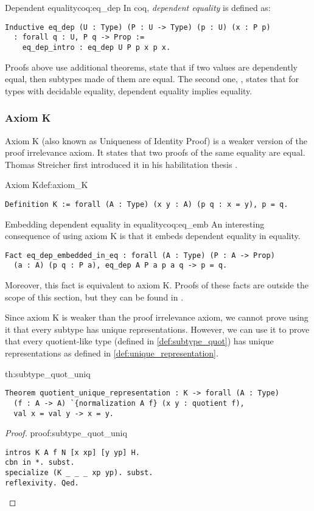 \begin{coq}{Dependent equality}{coq:eq_dep}
In coq, \emph{dependent equality} is defined as:
\begin{verbatim}
Inductive eq_dep (U : Type) (P : U -> Type) (p : U) (x : P p) 
  : forall q : U, P q -> Prop :=
    eq_dep_intro : eq_dep U P p x p x.
\end{verbatim}
Proofs above use additional theorems,  state that if two values are dependently equal, then subtypes made of them are equal. The second one, , states that for types with decidable equality, dependent equality implies equality.
\end{coq}

\subsubsection{Axiom K}
Axiom K (also known as Uniqueness of Identity Proof) is a weaker version of the proof irrelevance axiom. It states that two proofs of the same equality are equal. Thomas Streicher first introduced it in his habilitation thesis \cite{Streicher}.
\begin{defi}{Axiom K}{def:axiom_K}
\begin{verbatim}
Definition K := forall (A : Type) (x y : A) (p q : x = y), p = q.
\end{verbatim}
\end{defi}
\begin{coq}{Embedding dependent equality in equality}{coq:eq_emb}
An interesting consequence of using axiom K is that it embeds dependent equality in equality.
\begin{verbatim}
Fact eq_dep_embedded_in_eq : forall (A : Type) (P : A -> Prop)
  (a : A) (p q : P a), eq_dep A P a p a q -> p = q.
\end{verbatim}
Moreover, this fact is equivalent to axiom K. Proofs of these facts are outside the scope of this section, but they can be found in .
\end{coq}
Since axiom K is weaker than the proof irrelevance axiom, we cannot prove using it that every subtype has unique representations. However, we can use it to prove that every quotient-like type (defined in \ref{def:subtype_quot}) has unique representations as defined in \ref{def:unique_representation}.
\begin{theo}{}{th:subtype_quot_uniq}
\begin{verbatim}
Theorem quotient_unique_representation : K -> forall (A : Type) 
  (f : A -> A) `{normalization A f} (x y : quotient f),
  val x = val y -> x = y.
\end{verbatim}
\end{theo}
\begin{proof}{}{proof:subtype_quot_uniq}
\begin{verbatim}
intros K A f N [x xp] [y yp] H. 
cbn in *. subst. 
specialize (K _ _ _ xp yp). subst. 
reflexivity. Qed.
\end{verbatim}
\end{proof}
